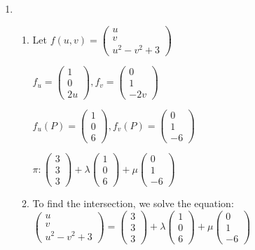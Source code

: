 \documentclass{article}
\begin{document}
\begin{enumerate}[label=(\alph*)]
\item
\begin{enumerate}[label=(\roman*)]
\item
Let $f(u,v) = \begin{pmatrix}
u\\v\\u^2-v^2+3
\end{pmatrix}$

$f_u = \begin{pmatrix}
1\\0\\2u
\end{pmatrix}, f_v = \begin{pmatrix}
0\\1\\-2v
\end{pmatrix}$

$f_u(P) = \begin{pmatrix}
1\\0\\6
\end{pmatrix}, f_v(P) = \begin{pmatrix}
0\\1\\-6
\end{pmatrix}$

$\pi: \begin{pmatrix}
3\\3\\3
\end{pmatrix} + \lambda \begin{pmatrix}
1\\0\\6
\end{pmatrix} + \mu \begin{pmatrix}
0\\1\\-6
\end{pmatrix}$

\item
To find the intersection, we solve the equation: $
\begin{pmatrix}
u\\v\\u^2-v^2+3
\end{pmatrix}
=
\begin{pmatrix}
3\\3\\3
\end{pmatrix} + \lambda \begin{pmatrix}
1\\0\\6
\end{pmatrix} + \mu \begin{pmatrix}
0\\1\\-6
\end{pmatrix}
$


\end{enumerate}
\end{enumerate}
\end{document}
